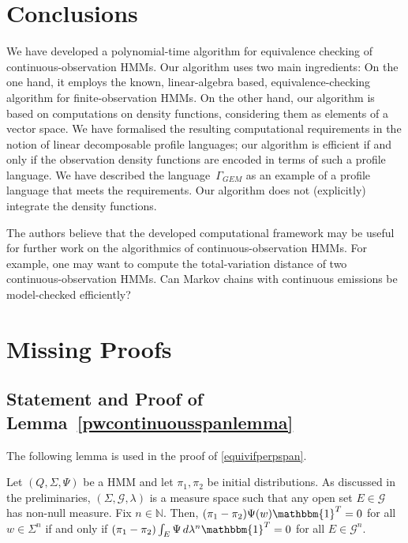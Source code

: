 \documentclass[a4paper,UKenglish,cleveref, autoref,mathscr]{lipics-v2019}
\newcommand{\NN}{\mathbb{N}}
\newcommand{\GG}{\mathscr{G}}
\newcommand{\1}{\mathbbm{1}}
\newcommand{\pl}{\Gamma_{\mathit{GEM}}}
\begin{document}
\section{Conclusions}

We have developed a polynomial-time algorithm for equivalence checking of continuous-observation HMMs.
Our algorithm uses two main ingredients:
On the one hand, it employs the known, linear-algebra based, equivalence-checking algorithm for finite-observation HMMs.
On the other hand, our algorithm is based on computations on density functions, considering them as elements of a vector space.
We have formalised the resulting computational requirements in the notion of linear decomposable profile languages; our algorithm is efficient if and only if the observation density functions are encoded in terms of such a profile language.
We have described the language~$\pl$ as an example of a profile language that meets the requirements.
Our algorithm does not (explicitly) integrate the density functions.

The authors believe that the developed computational framework may be useful for further work on the algorithmics of continuous-observation HMMs.
For example, one may want to compute the total-variation distance of two continuous-observation HMMs.
Can Markov chains with continuous emissions be model-checked efficiently?



\appendix

\section{Missing Proofs}\label{alternants}

\subsection{Statement and Proof of Lemma~\ref{pwcontinuousspanlemma}}

The following lemma is used in the proof of \cref{equivifperpspan}.

\begin{lemma}\label{pwcontinuousspanlemma}
Let $(Q, \Sigma, \Psi)$ be a HMM and let $\pi_1, \pi_2$ be initial distributions. As discussed in the preliminaries, $(\Sigma, \GG, \lambda)$ is a measure space such that any open set $E \in \GG$ has non-null measure. Fix $n \in \NN$. Then, $(\pi_1 - \pi_2) \Psi(w) \1^T = 0$ for all $w \in \Sigma^n$ if and only if $(\pi_1 - \pi_2)\int_{E} \Psi\,  d\lambda^n \1^T = 0$ for all $E \in \GG^n$.
\end{lemma}
\end{document}
